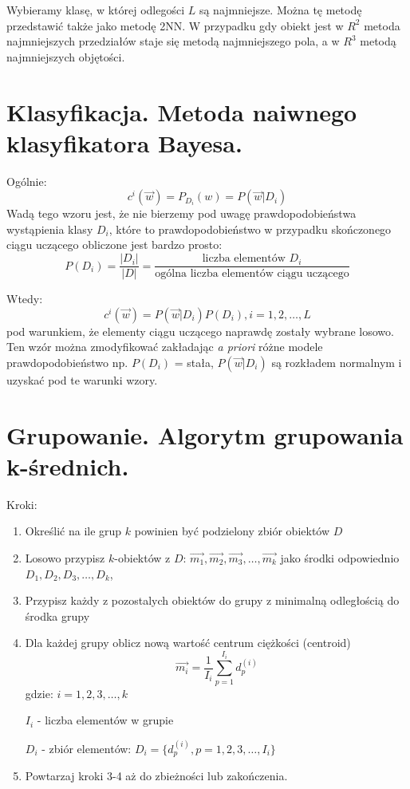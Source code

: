 \documentclass[a4paper,10pt]{article}
\begin{document}
Wybieramy klasę, w której odlegości $L$ są najmniejsze. Można tę metodę przedstawić także jako metodę 2NN.
W przypadku gdy obiekt jest w $R^2$ metoda najmniejszych przedziałów staje się metodą najmniejszego pola, a w $R^3$ metodą najmniejszych objętości.

\section{Klasyfikacja. Metoda naiwnego klasyfikatora Bayesa.}
Ogólnie:
\begin{equation}
c^i(\overrightarrow{w})=P_{D_i}(w)=P(\overrightarrow{w}|D_i)
\end{equation}
Wadą tego wzoru jest, że nie bierzemy pod uwagę prawdopodobieństwa wystąpienia klasy $D_i$, które to prawdopodobieństwo w przypadku skończonego ciągu uczącego obliczone jest bardzo prosto:
\begin{equation}
P(D_i)=\frac{|D_i|}{|D|}=\frac{\mbox{liczba elementów $D_i$}}{\mbox{ogólna liczba elementów ciągu uczącego}}
\end{equation}

Wtedy:
\begin{equation}
c^i(\overrightarrow{w})=P(\overrightarrow{w}|D_i)P(D_i), i=1,2,\ldots,L
\end{equation}
pod warunkiem, że elementy ciągu uczącego naprawdę zostały wybrane losowo.
Ten wzór można zmodyfikować zakładając \textit{a priori} różne modele prawdopodobieństwo np. $P(D_i)$ = stała, $P(\overrightarrow{w}|D_i)$ są rozkładem normalnym
i uzyskać pod te warunki wzory.

\section{Grupowanie. Algorytm grupowania k-średnich.}
Kroki:
\begin{enumerate}
\item Określić na ile grup $k$ powinien być podzielony zbiór obiektów $D$
\item Losowo przypisz $k$-obiektów z $D$: $\overrightarrow{m_1}, \overrightarrow{m_2}, \overrightarrow{m_3}, \ldots, \overrightarrow{m_k}$ jako środki odpowiednio $D_1, D_2, D_3, \ldots, D_k$,
\item Przypisz każdy z pozostalych obiektów do grupy z minimalną odległością do środka grupy
\item Dla każdej grupy oblicz nową wartość centrum ciężkości (centroid)
\begin{equation}
\overrightarrow{m_i} = \frac{1}{I_i} \sum_{p=1}^{I_i} d_p^{(i)}
\end{equation}
gdzie:
$i=1,2,3,\ldots,k$

$I_i$ - liczba elementów w grupie

$D_i$ - zbiór elementów: $D_i = \{d_p^{(i)}, p = 1,2,3,\ldots,I_i\}$
\item Powtarzaj kroki 3-4 aż do zbieżności lub zakończenia.
\end{enumerate}
\end{document}
